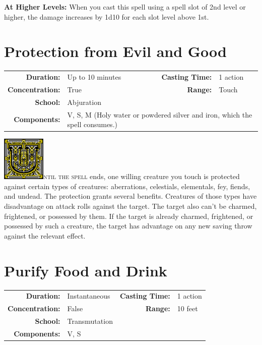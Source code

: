 \documentclass[12pt,showtrims]{memoir}
\begin{document}
\vspace{2\baselineskip}\noindent
\textbf{At Higher Levels:} When you cast this spell using a spell slot of 2nd level or higher, the damage increases by 1d10 for each slot level above 1st.
\newpage
\section*{Protection from Evil and Good}

{
\small\centering\vspace{-6pt}
\begin{tabular}{rlrl}
\toprule

\textbf{Duration:} & Up to 10 minutes &
\textbf{Casting Time:} & 1 action \\
\textbf{Concentration:} & True &
\textbf{Range:} & Touch \\
\textbf{School:} & Abjuration \\
\textbf{Components:} & \multicolumn{3}{p{0.7\textwidth}}{V, S, M (Holy water or powdered silver and iron, which the spell consumes.)}\\

\bottomrule
\end{tabular}
}

\vspace{1\baselineskip}\noindent 
\lettrine[lines=4]{\includegraphics[height=60pt]{initials/U.png}}{ntil the spell} ends, one willing creature you touch is protected against certain types of creatures: aberrations, celestials, elementals, fey, fiends, and undead. The protection grants several benefits. Creatures of those types have disadvantage on attack rolls against the target. The target also can't be charmed, frightened, or possessed by them. If the target is already charmed, frightened, or possessed by such a creature, the target has advantage on any new saving throw against the relevant effect.

\newpage
\section*{Purify Food and Drink}

{
\small\centering\vspace{-6pt}
\begin{tabular}{rlrl}
\toprule

\textbf{Duration:} & Instantaneous &
\textbf{Casting Time:} & 1 action \\
\textbf{Concentration:} & False &
\textbf{Range:} & 10 feet \\
\textbf{School:} & Transmutation \\
\textbf{Components:} & \multicolumn{3}{p{0.7\textwidth}}{V, S}\\

\bottomrule
\end{tabular}
}
\end{document}
